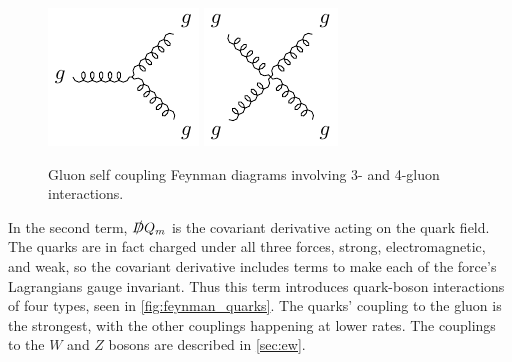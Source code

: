 \begin{centering}
\begin{figure}[!hbt]
\myfloatalign
\includegraphics[width=.45\linewidth]{feynman/gluon_3.pdf}
\includegraphics[width=.4\linewidth]{feynman/gluon_4.pdf}
\caption{Gluon self coupling Feynman diagrams involving 3- and 4-gluon interactions.}
\label{fig:feynman_gluons}
\end{figure}
\end{centering}

In the second term, $\slashed{D} Q_m$ is the covariant derivative acting on the quark field. The quarks are in fact charged under all three forces, strong, electromagnetic, and weak, so the covariant derivative includes terms to make each of the force's Lagrangians gauge invariant. Thus this term introduces quark-boson interactions of four types, seen in \autoref{fig:feynman_quarks}. The quarks' coupling to the gluon is the strongest, with the other couplings happening at lower rates. The couplings to the $W$ and $Z$ bosons are described in \autoref{sec:ew}.

